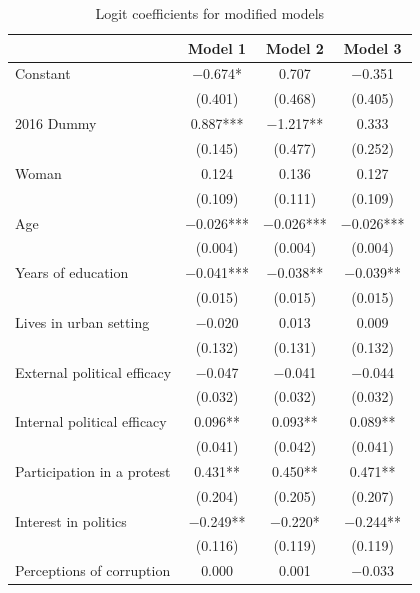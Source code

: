 \documentclass[12pt,a4]{article}\usepackage[]{graphicx}\usepackage[]{xcolor}
\begin{document}



\begin{table}[htbp]
\begin{center}
\caption{Logit coefficients for modified models}
\label{tab:complexmod}

\begin{tabular}[t]{lccc}
\toprule
  & Model 1 & Model 2 & Model 3\\
\midrule
Constant & \num{-0.674}* & \num{0.707} & \num{-0.351}\\
 & (\num{0.401}) & (\num{0.468}) & (\num{0.405})\\
2016 Dummy & \num{0.887}*** & \num{-1.217}** & \num{0.333}\\
 & (\num{0.145}) & (\num{0.477}) & (\num{0.252})\\
Woman & \num{0.124} & \num{0.136} & \num{0.127}\\
 & (\num{0.109}) & (\num{0.111}) & (\num{0.109})\\
Age & \num{-0.026}*** & \num{-0.026}*** & \num{-0.026}***\\
 & (\num{0.004}) & (\num{0.004}) & (\num{0.004})\\
Years of education & \num{-0.041}*** & \num{-0.038}** & \num{-0.039}**\\
 & (\num{0.015}) & (\num{0.015}) & (\num{0.015})\\
Lives in urban setting & \num{-0.020} & \num{0.013} & \num{0.009}\\
 & (\num{0.132}) & (\num{0.131}) & (\num{0.132})\\
External political efficacy & \num{-0.047} & \num{-0.041} & \num{-0.044}\\
 & (\num{0.032}) & (\num{0.032}) & (\num{0.032})\\
Internal political efficacy & \num{0.096}** & \num{0.093}** & \num{0.089}**\\
 & (\num{0.041}) & (\num{0.042}) & (\num{0.041})\\
Participation in a protest & \num{0.431}** & \num{0.450}** & \num{0.471}**\\
 & (\num{0.204}) & (\num{0.205}) & (\num{0.207})\\
Interest in politics & \num{-0.249}** & \num{-0.220}* & \num{-0.244}**\\
 & (\num{0.116}) & (\num{0.119}) & (\num{0.119})\\
Perceptions of corruption & \num{0.000} & \num{0.001} & \num{-0.033}\\

\end{tabular}
\end{center}
\end{table}
\end{document}
